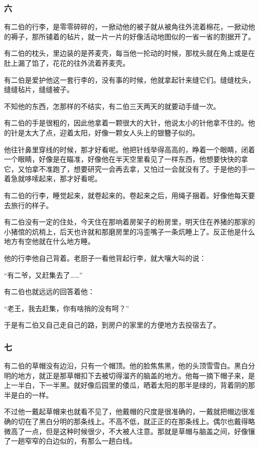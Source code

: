 \subsubsection*{六}
\par 有二伯的行李，是零零碎碎的，一掀动他的被子就从被角往外流着棉花，一掀动他的褥子，那所铺着的毡片，就一片一片的好像活动地图似的一省一省的割据开了。
\par 有二伯的枕头，里边装的是荞麦壳，每当他一抡动的时候，那枕头就在角上或是在肚上漏了馅了，花花的往外流着荞麦壳。
\par 有二伯是爱护他这一套行李的，没有事的时候，他就拿起针来缝它们。缝缝枕头，缝缝毡片，缝缝被子。
\par 不知他的东西，怎那样的不结实，有二伯三天两天的就要动手缝一次。
\par 有二伯的手是很粗的，因此他拿着一颗很大的大针，他说太小的针他拿不住的。他的针是太大了点，迎着太阳，好像一颗女人头上的银簪子似的。
\par 他往针鼻里穿线的时候，那才好看呢。他把针线举得高高的，睁着一个眼睛，闭着一个眼睛，好像是在瞄准，好像他在半天空里看见了一样东西，他想要快快的拿它，又怕拿不准跑了，想要研究一会再去拿，又怕过一会就没有了。于是他的手一着急就哆嗦起来，那才好看呢。
\par 有二伯的行李，睡觉起来，就卷起来的。卷起来之后，用绳子捆着。好像他每天要去旅行的样子。
\par 有二伯没有一定的住处，今天住在那响着房架子的粉房里，明天住在养猪的那家的小猪倌的炕梢上，后天也许就和那磨房里的冯歪嘴子一条炕睡上了。反正他是什么地方有空他就在什么地方睡。
\par 他的行李他自己背着。老厨子一看他背起行李，就大嚷大叫的说：
\par “有二爷，又赶集去了……”
\par 有二伯也就远远的回答着他：
\par “老王，我去赶集，你有啥捎的没有呵？”
\par 于是有二伯又自己走自己的路，到房户的家里的方便地方去投宿去了。
\subsubsection*{七}
\par 有二伯的草帽没有边沿，只有一个帽顶。他的脸焦焦黑，他的头顶雪雪白。黑白分明的地方，就正是那草帽扣下去被切得溜齐的脑盖的地方。他每一摘下帽子来，是上一半白，下一半黑。就好像后园里的倭瓜，晒着太阳的那半是绿的，背着阴的那半是白的一样。
\par 不过他一戴起草帽来也就看不见了，他戴帽的尺度是很准确的，一戴就把帽边很准确的切在了黑白分明的那条线上。不高不低，就正正的在那条线上。偶尔也戴得略微高了一点，但是这种时候很少，不大被人注意。那就是草帽与脑盖之间，好像镶了一趟窄窄的白边似的，有那么一趟白线。
